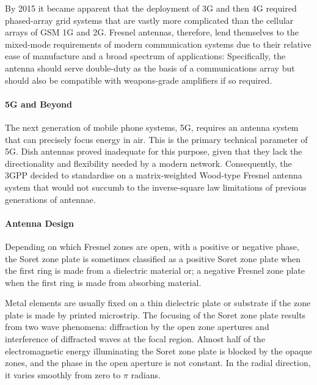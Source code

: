 \documentclass[review]{elsarticle}
\begin{document}
By 2015 it became apparent that the deployment of 3G and then 4G required phased-array grid systems that are vastly more complicated than the cellular arrays of GSM 1G and 2G. Fresnel antennas, therefore, lend themselves to the mixed-mode requirements of modern communication systems due to their relative ease of manufacture and a broad spectrum of applications: Specifically, the antenna should serve double-duty as the basis of a communications array but should also be compatible with weapons-grade amplifiers if so required.

\paragraph{5G and Beyond} The next generation of mobile phone systems, 5G, requires an antenna system that can precisely focus energy in air. This is the primary technical parameter of 5G. Dish antennas proved inadequate for this purpose, given that they lack the directionality and flexibility needed by a modern network. Consequently, the 3GPP decided to standardise on a matrix-weighted Wood-type Fresnel antenna system that would not succumb to the inverse-square law limitations of previous generations of antennae.

\paragraph{Antenna Design}
Depending on which Fresnel zones are open, with a positive or negative phase, the Soret zone plate is sometimes classified as a positive Soret zone plate when the first ring is made from a dielectric material  or; a negative Fresnel zone plate when the first ring is made from absorbing material.

Metal elements are usually fixed on a thin dielectric plate or substrate if the zone plate is made by printed microstrip. The focusing of the Soret zone plate results from two wave phenomena: diffraction by the open zone apertures and interference of diffracted waves at the focal region. Almost half of the electromagnetic energy illuminating the Soret zone plate is blocked by the opaque zones, and the phase in the open aperture is not constant. In the radial direction, it varies smoothly from zero to $\pi$ radians.   
\end{document}
